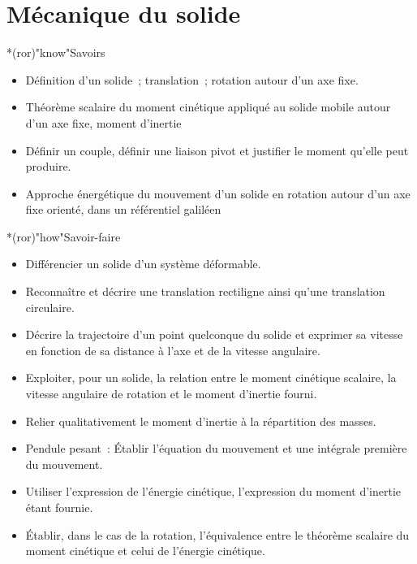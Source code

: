 \documentclass[../../main/main.tex]{subfiles}
\begin{document}
\setcounter{chapter}{7}


\chapter{M\'ecanique du solide}

\vspace*{\fill}

\begin{prgm}
	\footnotesize
	\begin{tcb}*(ror)"know"{Savoirs}
		\begin{itemize}
			\item Définition d’un solide~; translation~; rotation autour d'un axe
			      fixe.
			\item Théorème scalaire du moment cinétique appliqué au solide mobile
			      autour d’un axe fixe, moment d’inertie
			\item Définir un couple, définir une liaison pivot et justifier le moment
			      qu’elle peut produire.
			\item Approche énergétique du mouvement d’un solide en rotation autour
			      d’un axe fixe orienté, dans un référentiel galiléen
		\end{itemize}
	\end{tcb}
	\begin{tcb}*(ror)"how"{Savoir-faire}
		\begin{itemize}
			\item Différencier un solide d’un système déformable.
			\item Reconnaître et décrire une translation rectiligne ainsi qu’une
			      translation circulaire.
			\item Décrire la trajectoire d’un point quelconque du solide et exprimer
			      sa vitesse en fonction de sa distance à l’axe et de la vitesse
			      angulaire.
			\item Exploiter, pour un solide, la relation entre le moment cinétique
			      scalaire, la vitesse angulaire de rotation et le moment d’inertie
			      fourni.
			\item Relier qualitativement le moment d’inertie à la répartition des
			      masses.
			\item Pendule pesant~: Établir l’équation du mouvement et une intégrale
			      première du mouvement.
			\item Utiliser l’expression de l’énergie cinétique, l’expression du moment
			      d’inertie étant fournie.
			\item Établir, dans le cas de la rotation, l’équivalence entre le théorème
			      scalaire du moment cinétique et celui de l’énergie cinétique.
		\end{itemize}
	\end{tcb}
\end{prgm}
\end{document}
